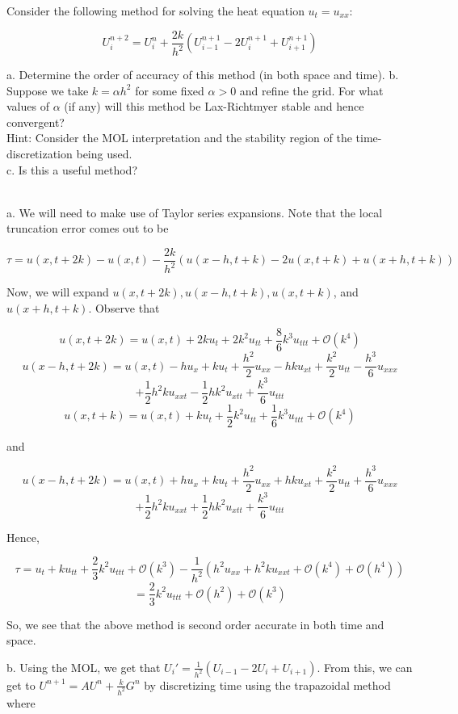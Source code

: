 Consider the following method for solving the heat equation $u_t=u_{xx}$:

$$U^{n+2}_i=U^n_i+\frac{2k}{h^2}(U^{n+1}_{i-1}-2U^{n+1}_i+U^{n+1}_{i+1})$$

a. Determine the order of accuracy of this method (in both space and time).
b. Suppose we take $k=\alpha h^2$ for some fixed $\alpha>0$ and refine the grid. For what values of
$\alpha$ (if any) will this method be Lax-Richtmyer stable and hence convergent?\\
Hint: Consider the MOL interpretation and the stability region of the time-discretization
being used.\\
c. Is this a useful method?\\

\begin{solution}\renewcommand{\qedsymbol}{}\ \\
    a. We will need to make use of Taylor series expansions. Note that the local truncation error comes
    out to be

    $$\tau=u(x,t+2k)-u(x,t)-\frac{2k}{h^2}(u(x-h,t+k)-2u(x,t+k)+u(x+h,t+k))$$

    Now, we will expand $u(x,t+2k), u(x-h,t+k), u(x,t+k)$, and $u(x+h,t+k)$. Observe that

    $$u(x,t+2k)=u(x,t)+2ku_t+2k^2u_{tt}+\frac86k^3u_{ttt}+\mathcal{O}(k^4)$$
    $$u(x-h,t+2k)=u(x,t)-hu_x+ku_t+\frac{h^2}{2}u_{xx}-hku_{xt}+\frac{k^2}{2}u_{tt}
    -\frac{h^3}{6}u_{xxx}$$
    $$+\frac12h^2ku_{xxt}-\frac12hk^2u_{xtt}+\frac{k^3}{6}u_{ttt}$$
    $$u(x,t+k)=u(x,t)+ku_t+\frac12k^2u_{tt}+\frac16k^3u_{ttt}+\mathcal{O}(k^4)$$

    and

    $$u(x-h,t+2k)=u(x,t)+hu_x+ku_t+\frac{h^2}{2}u_{xx}+hku_{xt}+\frac{k^2}{2}u_{tt}
    +\frac{h^3}{6}u_{xxx}$$
    $$+\frac12h^2ku_{xxt}+\frac12hk^2u_{xtt}+\frac{k^3}{6}u_{ttt}$$

    Hence,

    $$\tau=u_t+ku_{tt}+\frac23k^2u_{ttt}+\mathcal{O}(k^3)-\frac{1}{h^2}(h^2u_{xx}+h^2ku_{xxt}
    +\mathcal{O}(k^4)+\mathcal{O}(h^4))$$
    $$=\frac23k^2u_{ttt}+\mathcal{O}(h^2)+\mathcal{O}(k^3)$$

    So, we see that the above method is second order accurate in both time and space.

    b. Using the MOL, we get that $U_i'=\frac{1}{h^2}(U_{i-1}-2U_i+U_{i+1})$. From this, we can get to
    $U^{n+1}=AU^n+\frac{k}{h^2}G^n$ by discretizing time using the trapazoidal method where


\end{solution}
